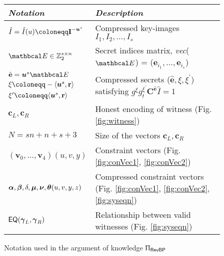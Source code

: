 \begin{figure}[h!]
  \begin{center}
    \renewcommand{\arraystretch}{1.3}
    \begin{tabular*}{0.969\textwidth}{|l | l |}
    \hline
    \textit{Notation} & \textit{Description} \\\hline
    $\hat{I} = \hat{I}(u) \coloneqq \textbf{I}^{-\vecnb{u}^s}$ & Compressed key-images $I_1, I_2, \dots, I_s$ \\\hline
    $\Emat \in \Z_2^{s\times n}$ & Secret indices matrix, \textsl{vec}($\Emat$) = ($\textbf{e}_{i_1}, \dots, \textbf{e}_{i_s}$) \\\hline
    $\hat{\textbf{e}} = \vecnb{u}^s \Emat$ & \multirow{3}{*}{Compressed secrets ($\hat{\textbf{e}}, \xi, \xi^{\prime}$) satisfying $g^{\xi} g_t^{\xi^{\prime}}  \textbf{C}^{\hat{\textbf{e}}}  \hat{I} = 1$}\\
    $\xi \coloneqq -\langle \vecnb{u}^s, \textbf{r} \rangle $ & \\
    $\xi^{\prime} \coloneqq \langle \vecnb{u}^s, \textbf{r}\rangle$ & \\\hline
    $\textbf{c}_L, \textbf{c}_R$ & Honest encoding of witness (Fig. \ref{fig:witness}) \\\hline
    $N=s n + n + s + 3$ & Size of the vectors $\textbf{c}_L, \textbf{c}_R$ \\\hline
    $(\textbf{v}_0, \dots, \textbf{v}_4)(u,v,y)$ & Constraint vectors (Fig. \ref{fig:conVec1}, \ref{fig:conVec2})\\\hline
    ${\boldsymbol{\alpha}}, {\boldsymbol{\beta}}, \delta, {\boldsymbol{\mu}}, {\boldsymbol{\nu}}, {\boldsymbol{\theta}}(u,v,y,z)$ & Compressed constraint vectors (Fig. \ref{fig:conVec1}, \ref{fig:conVec2}, \ref{fig:syseqn}) \\ \hline
    $\textsf{EQ}({\boldsymbol{\gamma}}_L, {\boldsymbol{\gamma}}_R)$ & Relationship between valid witnesses (Fig. \ref{fig:syseqn})\\\hline
  \end{tabular*}
  \end{center}
  \caption{Notation used in the argument of knowledge $\Uppi_{\textsf{RevBP}}$}
  \label{fig:notation}
\end{figure}
\renewcommand{\arraystretch}{1}
  
